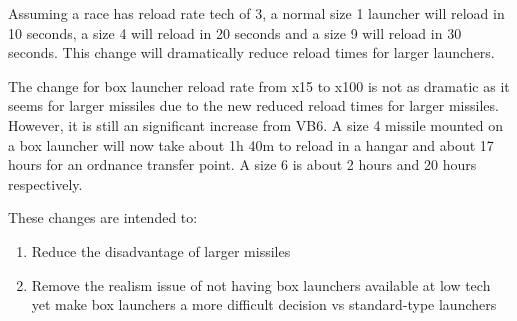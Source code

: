 \documentclass[../../Aurora C# unofficial manual.tex]{subfiles}
\begin{document}
	Assuming a race has reload rate tech of 3, a normal size 1 launcher will reload in 10 seconds, a size 4 will reload in 20 seconds and a size 9 will reload in 30 seconds. This change will dramatically reduce reload times for larger launchers.
	
	The change for box launcher reload rate from x15 to x100 is not as dramatic as it seems for larger missiles due to the new reduced reload times for larger missiles. However, it is still an significant increase from VB6. A size 4 missile mounted on a box launcher will now take about 1h 40m to reload in a hangar and about 17 hours for an ordnance transfer point. A size 6 is about 2 hours and 20 hours respectively.
	
	These changes are intended to:
	\begin{enumerate}
		\item Reduce the disadvantage of larger missiles
		\item Remove the realism issue of not having box launchers available at low tech yet make box launchers a more difficult decision vs standard-type launchers
	\end{enumerate}
\end{document}
